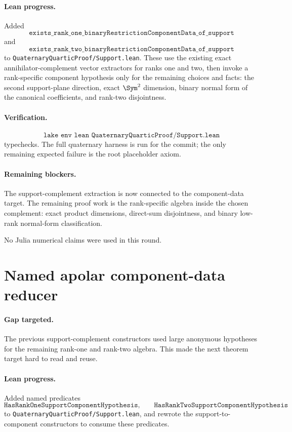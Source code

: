 \documentclass[11pt]{article}
\begin{document}
\paragraph{Lean progress.}
Added
\[
\texttt{exists\_rank\_one\_binaryRestrictionComponentData\_of\_support}
\]
and
\[
\texttt{exists\_rank\_two\_binaryRestrictionComponentData\_of\_support}
\]
to \texttt{QuaternaryQuarticProof/Support.lean}.  These use the existing exact
annihilator-complement vector extractors for ranks one and two, then invoke a
rank-specific component hypothesis only for the remaining choices and facts:
the second support-plane direction, exact \(\Sym^2\) dimension, binary normal
form of the canonical coefficients, and rank-two disjointness.

\paragraph{Verification.}
\[
\texttt{lake env lean QuaternaryQuarticProof/Support.lean}
\]
typechecks.  The full quaternary harness is run for the commit; the only
remaining expected failure is the root placeholder axiom.

\paragraph{Remaining blockers.}
The support-complement extraction is now connected to the component-data
target.  The remaining proof work is the rank-specific algebra inside the
chosen complement: exact product dimensions, direct-sum disjointness, and
binary low-rank normal-form classification.

No Julia numerical claims were used in this round.

\section*{Named apolar component-data reducer}

\paragraph{Gap targeted.}
The previous support-complement constructors used large anonymous hypotheses
for the remaining rank-one and rank-two algebra.  This made the next theorem
target hard to read and reuse.

\paragraph{Lean progress.}
Added named predicates
\[
\texttt{HasRankOneSupportComponentHypothesis},\qquad
\texttt{HasRankTwoSupportComponentHypothesis}
\]
to \texttt{QuaternaryQuarticProof/Support.lean}, and rewrote the
support-to-component constructors to consume these predicates.
\end{document}
